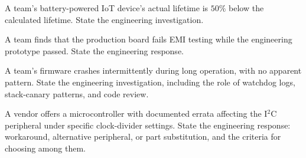 \begin{exercise}
A team's battery-powered IoT device's actual lifetime is $50\%$ below the calculated lifetime. State the engineering investigation.
\end{exercise}

\begin{exercise}
A team finds that the production board fails EMI testing while the engineering prototype passed. State the engineering response.
\end{exercise}

\begin{exercise}
A team's firmware crashes intermittently during long operation, with no apparent pattern. State the engineering investigation, including the role of watchdog logs, stack-canary patterns, and code review.
\end{exercise}

\begin{exercise}
A vendor offers a microcontroller with documented errata affecting the I$^2$C peripheral under specific clock-divider settings. State the engineering response: workaround, alternative peripheral, or part substitution, and the criteria for choosing among them.
\end{exercise}
